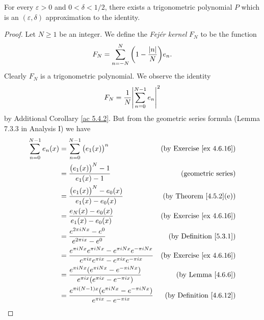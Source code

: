\begin{lemma}\label{5.4.6}
    For every \(\varepsilon > 0\) and \(0 < \delta < 1 / 2\), there exists a trigonometric polynomial \(P\) which is an \((\varepsilon, \delta)\) approximation to the identity.
\end{lemma}

\begin{proof}
    Let \(N \geq 1\) be an integer.
    We define the \emph{Fejér kernel} \(F_N\) to be the function
    \[
        F_N = \sum_{n = -N}^N \bigg(1 - \frac{\abs*{n}}{N}\bigg) e_n.
    \]
    Clearly \(F_N\) is a trigonometric polynomial.
    We observe the identity
    \[
        F_N = \frac{1}{N} \abs*{\sum_{n = 0}^{N - 1} e_n}^2
    \]
    by Additional Corollary \ref{ac 5.4.2}.
    But from the geometric series formula (Lemma 7.3.3 in Analysis I) we have
    \begin{align*}
        \sum_{n = 0}^{N - 1} e_n(x) & = \sum_{n = 0}^{N - 1} \big(e_1(x)\big)^n                                                                               & \text{(by Exercise \ref{ex 4.6.16})} \\
                                    & = \frac{\big(e_1(x)\big)^N - 1}{e_1(x) - 1}                                                                             & \text{(geometric series)}            \\
                                    & = \frac{\big(e_1(x)\big)^N - e_0(x)}{e_1(x) - e_0(x)}                                                                   & \text{(by Theorem \ref{4.5.2}(e))}   \\
                                    & = \frac{e_N(x) - e_0(x)}{e_1(x) - e_0(x)}                                                                               & \text{(by Exercise \ref{ex 4.6.16})} \\
                                    & = \frac{e^{2 \pi i N x} - e^0}{e^{2 \pi i x} - e^0}                                                                     & \text{(by Definition \ref{5.3.1})}   \\
                                    & = \frac{e^{\pi i N x} e^{\pi i N x} - e^{\pi i N x} e^{-\pi i N x}}{e^{\pi i x} e^{\pi i x} - e^{\pi i x} e^{-\pi i x}} & \text{(by Exercise \ref{ex 4.6.16})} \\
                                    & = \frac{e^{\pi i N x} (e^{\pi i N x} - e^{-\pi i N x})}{e^{\pi i x} (e^{\pi i x} - e^{-\pi i x})}                       & \text{(by Lemma \ref{4.6.6})}        \\
                                    & = \frac{e^{\pi i (N - 1) x} (e^{\pi i N x} - e^{-\pi i N x})}{e^{\pi i x} - e^{-\pi i x}}                               & \text{(by Definition \ref{4.6.12})}  \\

\end{align*}
\end{proof}
